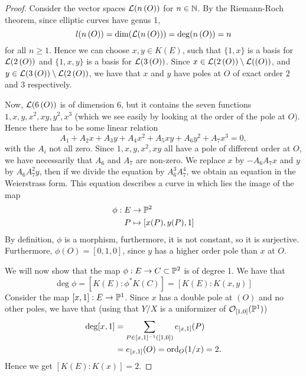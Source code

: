 \begin{proof}
	Consider the vector spaces $\mathcal{L}(n\,(O))$ for $n \in \mathbb{N}$.
	By the Riemann-Roch theorem, since elliptic curves have genus 1,
	\begin{equation*}
		l(n\,(O)) = \dim(\mathcal{L}(n\,(O))) = \deg(n\,(O)) = n
	\end{equation*}
	for all $n \geq 1$. Hence we can choose $x, y \in K(E)$, such that
	$\{1, x\}$ is a basis for $\mathcal{L}(2\,(O))$ and $\{1, x, y\}$
	is a basis for $\mathcal{L}(3\,(O))$.
	Since $x \in \mathcal{L}(2\,(O))\setminus\mathcal{L}((O))$, 
	and $y \in \mathcal{L}(3\,(O))\setminus\mathcal{L}(2\,(O))$, we have that
	$x$ and $y$ have poles at $O$ of exact order $2$ and $3$
	respectively.
	
	Now, $\mathcal{L}(6\,(O))$ is of dimension $6$, but it contains the seven
	functions $1, x, y, x^2, xy, y^2, x^3$ (which we see easily by
	looking at the order of the pole at $O$). Hence there has to be some
	linear relation
	\begin{equation*}
		A_1 + A_2x + A_3y + A_4x^2 + A_5xy + A_6y^2 + A_7x^3 = 0,
	\end{equation*}
	with the $A_i$ not all zero.
	Since $1, x, y, x^2, xy$ all have a pole of different order at $O$,
	we have necessarily that $A_6$ and $A_7$ are non-zero.
	We replace $x$ by $-A_6A_7x$ and $y$ by $A_6A_7^2y$, then if we divide 
	the equation by $A_6^3A_7^4$, we obtain an equation in the Weierstrass
	form. This equation describes a curve in which lies the image of the map
	\begin{align*}
		\phi:E &\to \mathbb{P}^2\\
		P &\mapsto [x(P), y(P), 1]
	\end{align*}
	By definition, $\phi$ is a morphism, furthermore, it is not constant,
	so it is surjective. Furthermore, $\phi(O) = [0, 1, 0]$, since
	$y$ has a higher order pole than $x$ at $O$.

	We will now show that the map $\phi: E\to C\subset \mathbb{P}^2$ is of degree 1.
	We have that
	\begin{equation*}
		\deg\phi = [K(E): \phi^*K(C)] = [K(E): K(x, y)]
	\end{equation*}
	Consider the map $[x, 1]: E \to \mathbb{P}^1$. Since $x$ has a double pole
	at $(O)$ and no other poles, we have that (using that
	$Y/X$ is a uniformizer of $\mathcal{O}_{[1, 0]}(\mathbb{P}^1)$)
	\begin{align*}
		\deg[x, 1] &= \sum_{P \in [x, 1]^{-1}([1, 0])}
		e_{[x, 1]}(P)\\
		&= e_{[x, 1]}(O)
		= \operatorname{ord}_O(1/x) = 2.
	\end{align*}
	Hence we get $[K(E): K(x)] = 2$.
	

\end{proof}

